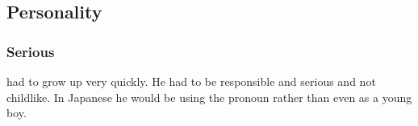 \subsection{Personality}





\subsubsection{Serious}
\Thanatzil had to grow up very quickly. 
He had to be responsible and serious and not childlike.
In Japanese he would be using the pronoun \emph{} rather than \emph{} even as a young boy. 































